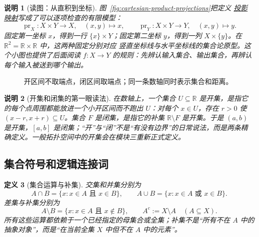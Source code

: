 \documentclass[UTF8,fontset=none,a4paper,11pt]{ctexart}
\theoremstyle{foundation-definition}
\newtheorem{definition}{定义}[section]
\theoremstyle{foundation-theorem}
\theoremstyle{foundation-proposition}
\theoremstyle{foundation-example}
\theoremstyle{foundation-remark}
\newtheorem{remark}[definition]{说明}
\theoremstyle{foundation-theorem}
\newcommand{\term}[2]{\hyperref[#1]{#2}}
\begin{document}
\begin{remark}[读图：从直积到坐标]
图~\ref{fig:cartesian-product-projections}把定义
\term{def:projection-map}{投影映射}写成了可以逐项检查的有限模型：
\[
\operatorname{pr}_{X}:X\times Y\longrightarrow X,\quad (x,y)\longmapsto x,
\qquad
\operatorname{pr}_{Y}:X\times Y\longrightarrow Y,\quad (x,y)\longmapsto y.
\]
固定第一坐标 $x$，得到一行 $\{x\}\times Y$；固定第二坐标 $y$，得到一列
$X\times\{y\}$。在 $\mathbb R^2=\mathbb R\times\mathbb R$ 中，这两种固定分别对应
竖直坐标线与水平坐标线的集合论原型。这个小图也提供了后面阅读
$f:X\to Y$ 的规则：先辨认输入集合、输出集合，再辨认每个输入被送到哪个输出。
\end{remark}

\begin{figure}[htbp]
\centering
{}
\caption{开区间不取端点，闭区间取端点；同一条数轴同时表示集合和距离。}
\label{fig:intervals}
\end{figure}

\begin{remark}[开集和闭集的第一眼读法]
在数轴上，一个集合 \(U\subseteq\mathbb R\) 是开集，是指它的每个点周围都能放进一个小开区间而不跑出 \(U\)：对每个 \(x\in U\)，存在 \(r>0\) 使 \((x-r,x+r)\subseteq U\)。集合 \(F\) 是闭集，是指它的补集 \(\mathbb R\setminus F\) 是开集。于是 \((a,b)\) 是开集，\([a,b]\) 是闭集；“开”与“闭”不是“有没有边界”的日常说法，而是两条精确定义。一般拓扑空间中的开集会在模块三重新正式定义。
\end{remark}

\subsection{集合符号和逻辑连接词}

\begin{definition}[集合运算与补集]\label{def:set-operations}
交集和并集分别为
\[
A\cap B=\{x:x\in A\text{ 且 }x\in B\},\qquad
A\cup B=\{x:x\in A\text{ 或 }x\in B\}.
\]
差集与补集分别为
\[
A\setminus B=\{x:x\in A\text{ 且 }x\notin B\},
\qquad
A^c:=X\setminus A\quad(A\subseteq X).
\]
所有这些运算都依赖于一个已经指定的母集合或全集；补集不是“所有不在 \(A\) 中的抽象对象”，而是“在当前全集 \(X\) 中但不在 \(A\) 中的元素”。
\end{definition}
\end{document}
